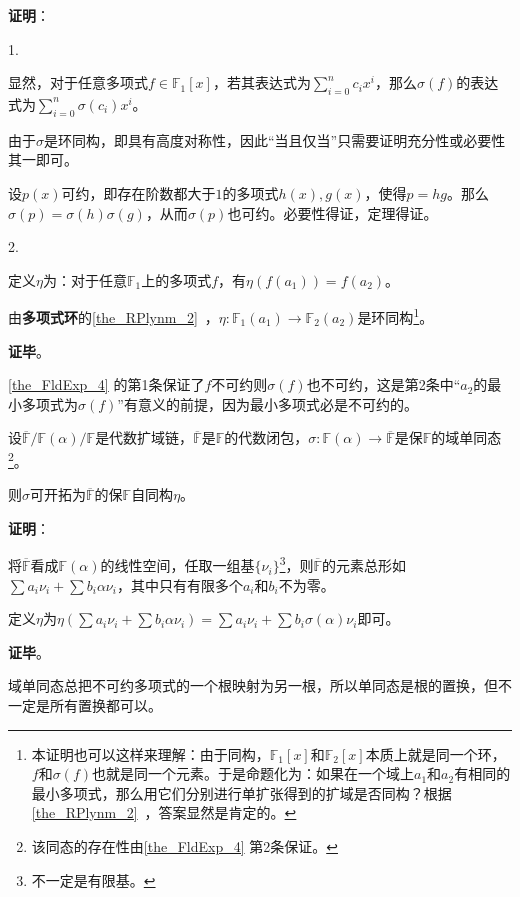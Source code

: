 \textbf{证明}：

1. 

显然，对于任意多项式$f\in\mathbb{F}_1[x]$，若其表达式为$\sum_{i=0}^n c_ix^i$，那么$\sigma(f)$的表达式为$\sum_{i=0}^n \sigma(c_i)x^i$。

由于$\sigma$是环同构，即具有高度对称性，因此“当且仅当”只需要证明充分性或必要性其一即可。

设$p(x)$可约，即存在阶数都大于$1$的多项式$h(x),g(x)$，使得$p=hg$。那么$\sigma(p)=\sigma(h)\sigma(g)$，从而$\sigma(p)$也可约。必要性得证，定理得证。

2. 

定义$\eta$为：对于任意$\mathbb{F}_1$上的多项式$f$，有$\eta(f(a_1))=f(a_2)$。

由\textbf{多项式环}的\autoref{the_RPlynm_2}~，$\eta:\mathbb{F}_1(a_1)\to \mathbb{F}_2(a_2)$是环同构\footnote{本证明也可以这样来理解：由于同构，$\mathbb{F}_1[x]$和$\mathbb{F}_2[x]$本质上就是同一个环，$f$和$\sigma(f)$也就是同一个元素。于是命题化为：如果在一个域上$a_1$和$a_2$有相同的最小多项式，那么用它们分别进行单扩张得到的扩域是否同构？根据\autoref{the_RPlynm_2}~，答案显然是肯定的。}。



\textbf{证毕}。

\autoref{the_FldExp_4} 的第1条保证了$f$不可约则$\sigma(f)$也不可约，这是第2条中“$a_2$的最小多项式为$\sigma(f)$”有意义的前提，因为最小多项式必是不可约的。

\begin{theorem}{}\label{the_FldExp_5}
设$\overline{\mathbb{F}}/\mathbb{F}(\alpha)/\mathbb{F}$是代数扩域链，$\overline{\mathbb{F}}$是$\mathbb{F}$的代数闭包，$\sigma:\mathbb{F}(\alpha)\to\overline{\mathbb{F}}$是保$\mathbb{F}$的域单同态\footnote{该同态的存在性由\autoref{the_FldExp_4} 第2条保证。}。

则$\sigma$可开拓为$\overline{\mathbb{F}}$的保$\mathbb{F}$自同构$\eta$。
\end{theorem}

\textbf{证明}：


将$\overline{\mathbb{F}}$看成$\mathbb{F}(\alpha)$的线性空间，任取一组基$\{\nu_i\}$\footnote{不一定是有限基。}，则$\overline{\mathbb{F}}$的元素总形如$\sum a_i\nu_i+\sum b_i\alpha\nu_i$，其中只有有限多个$a_i$和$b_i$不为零。

定义$\eta$为$\eta(\sum a_i\nu_i+\sum b_i\alpha\nu_i) = \sum a_i\nu_i+\sum b_i\sigma(\alpha)\nu_i$即可。

\textbf{证毕}。

域单同态总把不可约多项式的一个根映射为另一根，所以单同态是根的置换，但不一定是所有置换都可以。

